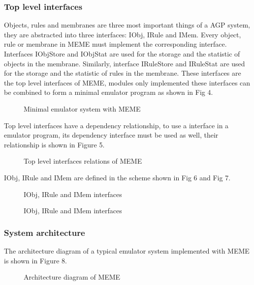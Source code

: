 \documentclass[9pt,a4paper,twoside]{article}
\newcommand\figpath{./paper/assets/figures/}
\begin{document}
        \subsubsection{Top level interfaces}
        Objects, rules and membranes are three most important things of a AGP system, they are abstracted into three interfaces: IObj, IRule and IMem.
        Every object, rule or membrane in MEME must implement the corresponding interface.
        Interfaces IObjStore and IObjStat are used for the storage and the statistic of objects in the membrane. 
        Similarly, interface IRuleStore and IRuleStat are used for the storage and the statistic of rules in the membrane. 
        These interfaces are the top level interfaces of MEME, modules only implemented these interfaces can be combined to form a minimal emulator program as shown in Fig 4.
        \begin{figure}[!htbp]
            \centering
            
            \caption{Minimal emulator system with MEME}
            \label{fig:fig4}
        \end{figure}

        Top level interfaces have a dependency relationship, to use a interface in a emulator program, its dependency interface must be used as well,
        their relationship is shown in Figure 5.
        \begin{figure}[!htbp]
            \centering
            
            \caption{Top level interfaces relations of MEME}
            \label{fig:fig5}
        \end{figure}

        IObj, IRule and IMem are defined in the scheme shown in Fig 6 and Fig 7.
        \begin{figure}[!htbp]
            \centering
            
            \caption{IObj, IRule and IMem interfaces}
            \label{fig:fig6}
        \end{figure}
        \begin{figure}[!htbp]
            \centering
            
            \caption{IObj, IRule and IMem interfaces}
            \label{fig:fig7}
        \end{figure}

        \subsubsection{System architecture}
        The architecture diagram of a typical emulator system implemented with MEME is shown in Figure 8.
        \begin{figure}[!htbp]
            \centering
            
            \caption{Architecture diagram of MEME}
            \label{fig:fig8}
        \end{figure}
\end{document}
